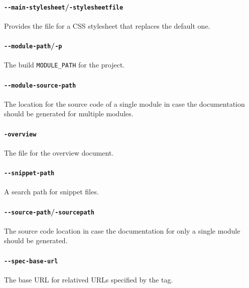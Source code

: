 \paragraph{\texttt{-{}-main-stylesheet}/\texttt{-stylesheetfile}} Provides the file for a CSS stylesheet that replaces the default one.

\paragraph{\texttt{-{}-module-path}/\texttt{-p}} The build \mbox{\texttt{MODULE\_PATH}} for the project.

\paragraph{\texttt{-{}-module-source-path}} The location for the source code of a single module in case the documentation should be generated for multiple modules.

\paragraph{\texttt{-overview}} The file for the overview document.

\paragraph{\texttt{-{}-snippet-path}} A search path for snippet files.

\paragraph{\texttt{-{}-source-path}/\texttt{-sourcepath}} The source code location in case the documentation for only a single module should be generated.

\paragraph{\texttt{-{}-spec-base-url}} The base URL for relatived URLs specified by the   tag.


